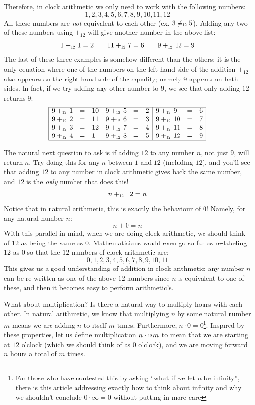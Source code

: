 \documentclass[oneside]{book}
\newcommand\scalemath[2]{\scalebox{#1}{\mbox{\ensuremath{\displaystyle #2}}}}
\newcommand{\Equiv}[1]{\equiv_{\scalemath{0.6}{#1}}}
\newcommand{\Plus}[1]{+_{\scalemath{0.6}{#1}}\,}
\newcommand{\Cdot}[1]{\cdot{\scalemath{0.6}{#1}}\,}
\begin{document}
Therefore, in clock arithmetic we only need to work with the following numbers:
\[
  1,2,3,4,5,6,7,8,9,10,11,12
\]
All these numbers are \emph{not} equivalent to each other (ex. $3\not\Equiv{12}5$). Adding any two of these
numbers using $+_{12}$ will give another number in the above list:
\[
  1\Plus{12}1 = 2\qquad 11\Plus{12}7 = 6 \qquad 9\Plus{12}12 = 9
\]
The last of these three examples is somehow different than the others; it is the only equation where one of
the numbers on the left hand side of the addition $+_{12}$ also appears on the right hand side of the
equality; namely $9$ appears on both sides. In fact, if we try adding any other number to $9$, we see that only adding $12$ returns $9$:
\[\begin{array}{|lcl|lcl|lcl|}
  \hline
9\Plus{12}1 &=& 10 & 9\Plus{12}5 &=& 2 & 9\Plus{12}9 &=& 6 \\
9\Plus{12}2 &=& 11 & 9\Plus{12}6 &=& 3 & 9\Plus{12}10 &=& 7 \\
9\Plus{12}3 &=& 12 & 9\Plus{12}7 &=& 4 & 9\Plus{12}11 &=& 8 \\
9\Plus{12}4 &=& 1 & 9\Plus{12}8 &=& 5 & 9\Plus{12}12 &=& 9\\
\hline
\end{array}\]

The natural next question to ask is if adding $12$ to any number $n$, not just $9$, will return $n$. Try doing
this for any $n$ between $1$ and $12$ (including $12$), and you'll see that adding $12$ to any number in clock
arithmetic gives back the same number, and $12$ is the \emph{only} number that does this!
\[
  n \Plus{12}12 = n
\]
Notice that in natural arithmetic, this is exactly the behaviour of $0$! Namely, for any natural number $n$:
\[
  n + 0 = n
\]
With this parallel in mind, when we are doing clock arithmetic, we should think of $12$ as being the same
as $0$. Mathematicians would even go so far as re-labeling $12$ as $0$ so that the $12$ numbers of
clock arithmetic are:
\[
  0,1,2,3,4,5,6,7,8,9,10,11
\]
This gives us a good understanding of addition in clock arithmetic: any number $n$ can be re-written as one of
the above $12$ numbers since $n$ is equivalent to one of these, and then it becomes easy to perform
arithmetic's.

What about multiplication? Is there a natural way to multiply hours with each other. In natural arithmetic, we
know that multiplying $n$ by some natural number $m$ means we are adding $n$ to itself $m$ times. Furthermore,
$n\cdot 0 = 0$\footnote{For those who have contested this by asking ``what if we let $n$ be infinity'', there
  is \href{NOT_YET}{this article} addressing exactly how to think about infinity and why we shouldn't conclude
$0\cdot \infty = 0$ without putting in more care}. Inspired by these properties, let us define multiplication
$n\Cdot{12} m$ to mean that we are starting at $12$ o'clock (which we should think of as $0$ o'clock), and
we are moving forward $n$ hours a total of $m$ times.
\end{document}

